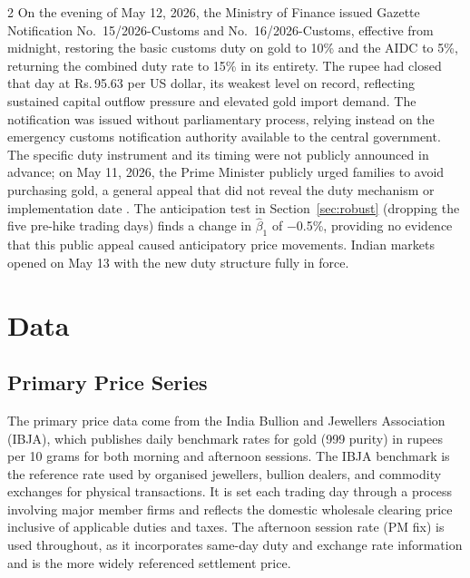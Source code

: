 \documentclass[12pt]{article}
\begin{document}
\begin{multicols}{2}
On the evening of May 12, 2026, the Ministry of Finance issued Gazette Notification No.\ 15/2026-Customs and No.\ 16/2026-Customs, effective from midnight, restoring the basic customs duty on gold to 10\% and the AIDC to 5\%, returning the combined duty rate to 15\% in its entirety. The rupee had closed that day at Rs.\,95.63 per US dollar, its weakest level on record, reflecting sustained capital outflow pressure and elevated gold import demand. The notification was issued without parliamentary process, relying instead on the emergency customs notification authority available to the central government. The specific duty instrument and its timing were not publicly announced in advance; on May 11, 2026, the Prime Minister publicly urged families to avoid purchasing gold, a general appeal that did not reveal the duty mechanism or implementation date \citep{WGC2026May}. The anticipation test in Section~\ref{sec:robust} (dropping the five pre-hike trading days) finds a change in $\hat{\beta}_1$ of $-$0.5\%, providing no evidence that this public appeal caused anticipatory price movements. Indian markets opened on May 13 with the new duty structure fully in force.

\section{Data}
\label{sec:data}

\subsection*{Primary Price Series}

The primary price data come from the India Bullion and Jewellers Association (IBJA), which publishes daily benchmark rates for gold (999 purity) in rupees per 10 grams for both morning and afternoon sessions. The IBJA benchmark is the reference rate used by organised jewellers, bullion dealers, and commodity exchanges for physical transactions. It is set each trading day through a process involving major member firms and reflects the domestic wholesale clearing price inclusive of applicable duties and taxes. The afternoon session rate (PM fix) is used throughout, as it incorporates same-day duty and exchange rate information and is the more widely referenced settlement price.


\end{multicols}
\end{document}
